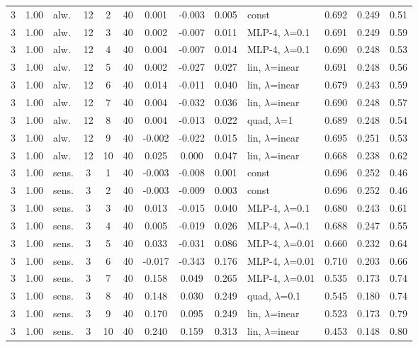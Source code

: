 \begin{scriptsize}
\begin{longtable}{cclcc c ccc l ccc}
3 & 1.00 & alw. & 12 & 2 & 40 & 0.001 & -0.003 & 0.005 & const & 0.692 & 0.249 & 0.51 \\
3 & 1.00 & alw. & 12 & 3 & 40 & 0.002 & -0.007 & 0.011 & MLP-4, $\lambda$=0.1 & 0.691 & 0.249 & 0.59 \\
3 & 1.00 & alw. & 12 & 4 & 40 & 0.004 & -0.007 & 0.014 & MLP-4, $\lambda$=0.1 & 0.690 & 0.248 & 0.53 \\
3 & 1.00 & alw. & 12 & 5 & 40 & 0.002 & -0.027 & 0.027 & lin, $\lambda$=inear & 0.691 & 0.248 & 0.56 \\
3 & 1.00 & alw. & 12 & 6 & 40 & 0.014 & -0.011 & 0.040 & lin, $\lambda$=inear & 0.679 & 0.243 & 0.59 \\
3 & 1.00 & alw. & 12 & 7 & 40 & 0.004 & -0.032 & 0.036 & lin, $\lambda$=inear & 0.690 & 0.248 & 0.57 \\
3 & 1.00 & alw. & 12 & 8 & 40 & 0.004 & -0.013 & 0.022 & quad, $\lambda$=1 & 0.689 & 0.248 & 0.54 \\
3 & 1.00 & alw. & 12 & 9 & 40 & -0.002 & -0.022 & 0.015 & lin, $\lambda$=inear & 0.695 & 0.251 & 0.53 \\
3 & 1.00 & alw. & 12 & 10 & 40 & 0.025 & 0.000 & 0.047 & lin, $\lambda$=inear & 0.668 & 0.238 & 0.62 \\
3 & 1.00 & sens. & 3 & 1 & 40 & -0.003 & -0.008 & 0.001 & const & 0.696 & 0.252 & 0.46 \\
3 & 1.00 & sens. & 3 & 2 & 40 & -0.003 & -0.009 & 0.003 & const & 0.696 & 0.252 & 0.46 \\
3 & 1.00 & sens. & 3 & 3 & 40 & 0.013 & -0.015 & 0.040 & MLP-4, $\lambda$=0.1 & 0.680 & 0.243 & 0.61 \\
3 & 1.00 & sens. & 3 & 4 & 40 & 0.005 & -0.019 & 0.026 & MLP-4, $\lambda$=0.1 & 0.688 & 0.247 & 0.55 \\
3 & 1.00 & sens. & 3 & 5 & 40 & 0.033 & -0.031 & 0.086 & MLP-4, $\lambda$=0.01 & 0.660 & 0.232 & 0.64 \\
3 & 1.00 & sens. & 3 & 6 & 40 & -0.017 & -0.343 & 0.176 & MLP-4, $\lambda$=0.01 & 0.710 & 0.203 & 0.66 \\
3 & 1.00 & sens. & 3 & 7 & 40 & 0.158 & 0.049 & 0.265 & MLP-4, $\lambda$=0.01 & 0.535 & 0.173 & 0.74 \\
3 & 1.00 & sens. & 3 & 8 & 40 & 0.148 & 0.030 & 0.249 & quad, $\lambda$=0.1 & 0.545 & 0.180 & 0.74 \\
3 & 1.00 & sens. & 3 & 9 & 40 & 0.170 & 0.095 & 0.249 & lin, $\lambda$=inear & 0.523 & 0.173 & 0.79 \\
3 & 1.00 & sens. & 3 & 10 & 40 & 0.240 & 0.159 & 0.313 & lin, $\lambda$=inear & 0.453 & 0.148 & 0.80 \\

\end{longtable}
\end{scriptsize}

